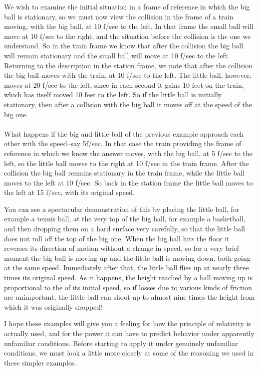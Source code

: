 We wish to examine the initial situation in a frame of reference in which the big ball is stationary, so we must now view the collision in the frame of a train moving, with the big ball, at 10 f/sec to the left. In that frame the small ball will move at 10 f/sec to the right, and the situation before the collision is the one we understand. So in the train frame we know that after the collision the big ball will remain stationary and the small ball will move at 10 f/sec to the left. Returning to the description in the station frame, we note that after the collision the big ball moves with the train, at 10 f/sec to the left. The little ball, however, moves at 20 f/sec to the left, since in each second it gains 10 feet on the train, which has itself moved 10 feet to the left. So if the little ball is initially stationary, then after a collision with the big ball it moves off at  the speed of the big one. 
\\\\
What happens if the big and little ball of the previous example approach each other with the  speed--say 5f/sec. In that case the train providing the frame of reference in which we know the answer moves, with the big ball, at 5 f/sec to the left, so the little ball moves to the right at 10 f/sec in the train frame. After the collision the big ball remains stationary in the train frame, while the little ball moves to the left at 10 f/sec. So back in the station frame the little ball moves to the left at 15 f/sec, with  its original speed.

You can see a spectacular demonstration of this by placing the little ball, for example a tennis ball, at the very top of the big ball, for example a basketball, and then dropping them on a hard surface very carefully, so that the little ball does not roll off the top of the big one. When the big ball hits the floor it reverses its direction of motion without a change in speed, so for a very brief moment the big ball is moving up and the little ball is moving down, both going at the same speed. Immediately after that, the little ball flies up at nearly three times its original speed. As it happens, the height reached by a ball moving up is proportional to the  of its initial speed, so if losses due to various kinds of friction are unimportant, the little ball can shoot up to almost nine times the height from which it was originally dropped!     

I hope these examples will give you a feeling for how the principle of relativity is actually used, and for the power it can have to predict behavior under apparently unfamiliar conditions. Before starting to apply it under genuinely unfamiliar conditions, we must look a little more closely at some of the reasoning we used in these simpler examples.

